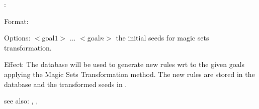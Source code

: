 :

Format: 

Options: $<$goal$1>$ ... $<$goal$n>$ the initial seeds for magic sets transformation.

Effect: The database  will be used to generate new rules wrt to the 
	given goals applying the Magic Sets Transformation method. The new rules
	are stored in the database  and the transformed seeds in 
	.

see also: \eval, , 


